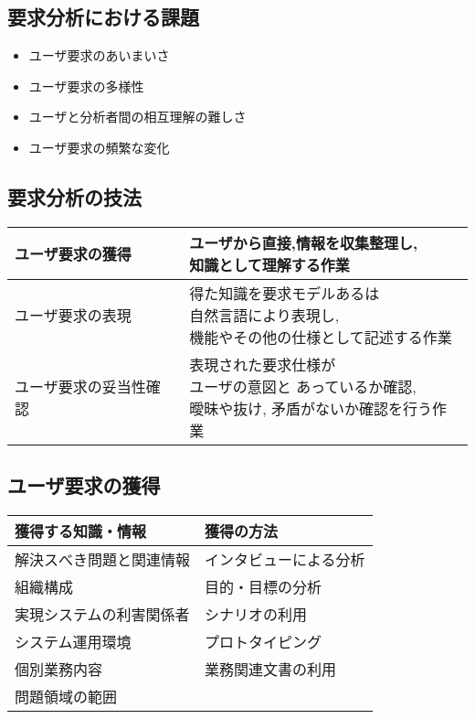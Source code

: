 \documentclass[8pt,twocolumn]{jsarticle}
\begin{document}
\subsection{要求分析における課題}
\begin{itemize}
				\item ユーザ要求のあいまいさ
				\item ユーザ要求の多様性
				\item ユーザと分析者間の相互理解の難しさ
				\item ユーザ要求の頻繁な変化
\end{itemize}
\subsection{要求分析の技法}
\begin{table}[htbp]
		\begin{tabular}{l|l}\\
				ユーザ要求の獲得&\shortstack{
						ユーザから直接,情報を収集整理し,
						\\知識として理解する作業}\\ \hline
				ユーザ要求の表現&\shortstack{
						得た知識を要求モデルあるは\\
						自然言語により表現し,\\
						機能やその他の仕様として記述する作業}\\ \hline
				ユーザ要求の妥当性確認&\shortstack{
						表現された要求仕様が\\ユーザの意図と
						あっているか確認,\\曖昧や抜け,
						矛盾がないか確認を行う作業}\\ \hline
		\end{tabular}
\end{table}
\subsection{ユーザ要求の獲得}
\begin{table}[htbp]
		\begin{tabular}{l|l}
				獲得する知識・情報&獲得の方法 \\ \hline
				解決スべき問題と関連情報&インタビューによる分析 \\
				組織構成&目的・目標の分析 \\
				実現システムの利害関係者&シナリオの利用 \\
				システム運用環境&プロトタイピング \\
				個別業務内容&業務関連文書の利用 \\
				問題領域の範囲& \\
		\end{tabular}
\end{table}
\end{document}
